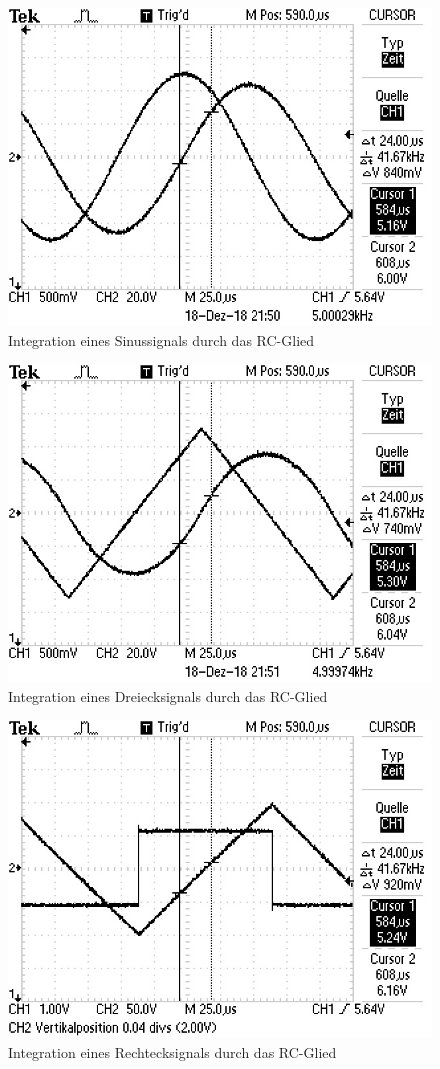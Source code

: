 \begin{figure}
  \centering
  \includegraphics[angle=90, scale=0.8]{content/Sinus.jpg} 
  \caption{Integration eines Sinussignals durch das RC-Glied}
  \label{fig:Sinus}
\end{figure}

\begin{figure}
  \centering
  \includegraphics[angle=90, scale=0.8]{content/Dreieck.jpg}
  \caption{Integration eines Dreiecksignals durch das RC-Glied}
  \label{fig:Dreieck}
\end{figure}

\begin{figure}
  \centering
  \includegraphics[angle=90, scale=0.8]{content/Rechteck.jpg}
  \caption{Integration eines Rechtecksignals durch das RC-Glied}
  \label{fig:Rechteck}
\end{figure}
